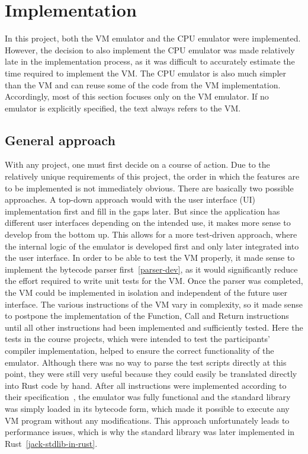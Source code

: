 \section{Implementation} \label{implementation}
In this project, both the VM emulator and the CPU emulator were implemented.
However, the decision to also implement the CPU emulator was made relatively late in the implementation process, as it was difficult to accurately estimate the time required to implement the VM.
The CPU emulator is also much simpler than the VM and can reuse some of the code from the VM implementation.
Accordingly, most of this section focuses only on the VM emulator.
If no emulator is explicitly specified, the text always refers to the VM.

\subsection{General approach}
With any project, one must first decide on a course of action.
Due to the relatively unique requirements of this project, the order in which the features are to be implemented is not immediately obvious.
There are basically two possible approaches.
A top-down approach would with the user interface (UI) implementation first and fill in the gaps later.
But since the application has different user interfaces depending on the intended use, it makes more sense to develop from the bottom up.
This allows for a more test-driven approach, where the internal logic of the emulator is developed first and only later integrated into the user interface.
In order to be able to test the VM properly, it made sense to implement the bytecode parser first~\ref{parser-dev}, as it would significantly reduce the effort required to write unit tests for the VM.
Once the parser was completed, the VM could be implemented in isolation and independent of the future user interface.
The various instructions of the VM vary in complexity, so it made sense to postpone the implementation of the Function, Call and Return instructions until all other instructions had been implemented and sufficiently tested.
Here the tests in the course projects, which were intended to test the participants' compiler implementation, helped to ensure the correct functionality of the emulator.
Although there was no way to parse the test scripts directly at this point, they were still very useful because they could easily be translated directly into Rust code by hand.
After all instructions were implemented according to their specification~\cite{nisan2005}, the emulator was fully functional and the standard library was simply loaded in its bytecode form, which made it possible to execute any VM program without any modifications.
This approach unfortunately leads to performance issues, which is why the standard library was later implemented in Rust~\ref{jack-stdlib-in-rust}.

